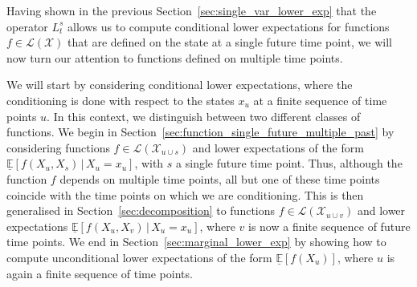 \documentclass[10pt,a4paper]{paper}
\theoremstyle{definition}
\newcommand{\states}{\mathcal{X}}
\newcommand{\gambles}{\mathcal{L}}
\newcommand{\gamblesX}{\gambles(\states)}
\begin{document}

Having shown in the previous Section~\ref{sec:single_var_lower_exp} that the operator $L_t^s$ allows us to compute conditional lower expectations for functions $f\in\gamblesX$ that are defined on the state at a single future time point, we will now turn our attention to functions defined on multiple time points. 

We will start by considering conditional lower expectations, where the conditioning is done with respect to the states $x_u$ at a finite sequence of time points $u$. In this context, we distinguish between two different classes of functions. 
We begin in Section~\ref{sec:function_single_future_multiple_past} by considering functions $f\in\gambles(\states_{u\cup s})$ and lower expectations of the form $\underline{\mathbb{E}}[f(X_u,X_s)\,\vert\,X_u=x_u]$, with $s$ a single future time point. Thus, although the function $f$ depends on multiple time points, all but one of these time points coincide with the time points on which we are conditioning. This is then generalised in Section~\ref{sec:decomposition} to functions $f\in\gambles(\states_{u\cup v})$ and lower expectations $\underline{\mathbb{E}}[f(X_u,X_v)\,\vert\,X_u=x_u]$, where $v$ is now a finite sequence of future time points. We end in Section~\ref{sec:marginal_lower_exp} by showing how to compute unconditional lower expectations of the form $\underline{\mathbb{E}}[f(X_u)]$, where $u$ is again a finite sequence of time points.
\end{document}
